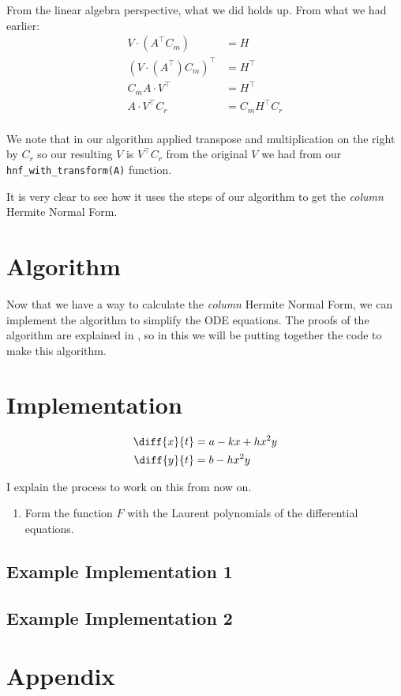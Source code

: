 \documentclass[oneside, a4paper, onecolumn, 11pt]{article}
\begin{document}
From the linear algebra perspective, what we did holds up. From what we had earlier:
\begin{align*}
    V \cdot (A^\intercal C_m)             & = H                   \\
    (V \cdot (A^\intercal) C_m)^\intercal & = H^\intercal         \\
    C_m A \cdot V^\intercal               & = H^\intercal         \\
    A \cdot V^\intercal C_r               & = C_m H^\intercal C_r \\
\end{align*}

We note that in our algorithm applied transpose and multiplication on the right by \(C_r\) so our resulting \(V\) is \(V^\intercal C_r\) from the original \(V\) we had from our \texttt{hnf\_with\_transform(A)} function.

It is very clear to see how it uses the steps of our algorithm to get the \textit{column} Hermite Normal Form.

\section{Algorithm}

Now that we have a way to calculate the \textit{column} Hermite Normal Form, we can implement the algorithm to simplify the ODE equations. The proofs of the algorithm are explained in \cite{Hubert2013}, so in this we will be putting together the code to make this algorithm.

\section{Implementation}

\begin{align*}
    \diff{x}{t}
     & = a - kx + hx^2y \\
    \diff{y}{t}
     & = b - h x^2 y
\end{align*}

I explain the process to work on this from now on.

\begin{enumerate}[label=Step \arabic*:]
    \item Form the function \(F\) with the Laurent polynomials of the differential equations.
\end{enumerate}

\subsection{Example Implementation 1}

\subsection{Example Implementation 2}

\newpage



\newpage
\appendix

\section{Appendix}
\label{sec:appendix}
\end{document}

